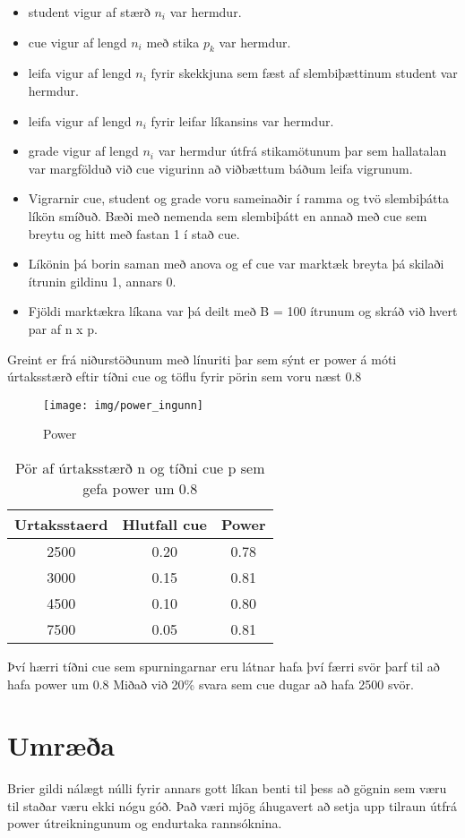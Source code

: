 \documentclass[
  10pt,
]{article}
\begin{document}
\begin{itemize}
\item
  student vigur af stærð \(n_i\) var hermdur.
\item
  cue vigur af lengd \(n_i\) með stika \(p_k\) var hermdur.
\item
  leifa vigur af lengd \(n_i\) fyrir skekkjuna sem fæst af slembiþættinum student var hermdur.
\item
  leifa vigur af lengd \(n_i\) fyrir leifar líkansins var hermdur.
\item
  grade vigur af lengd \(n_i\) var hermdur útfrá stikamötunum þar sem hallatalan var margfölduð við cue vigurinn að viðbættum báðum leifa vigrunum.
\item
  Vigrarnir cue, student og grade voru sameinaðir í ramma og tvö slembiþátta líkön smíðuð. Bæði með nemenda sem slembiþátt en annað með cue sem breytu og hitt með fastan 1 í stað cue.
\item
  Líkönin þá borin saman með anova og ef cue var marktæk breyta þá skilaði ítrunin gildinu 1, annars 0.
\item
  Fjöldi marktækra líkana var þá deilt með B = 100 ítrunum og skráð við hvert par af n x p.
\end{itemize}

Greint er frá niðurstöðunum með línuriti þar sem sýnt er power á móti úrtaksstærð eftir tíðni cue og töflu fyrir pörin sem voru næst 0.8

\begin{figure}[H]

{\centering \texttt{[image: img/power\_ingunn]} 

}

\caption{Power}\label{fig:mynd9}
\end{figure}

\begin{table}[!h]

\caption{\label{tab:unnamed-chunk-14}\label{tab:strings} Pör af úrtaksstærð n og tíðni cue p sem gefa power um 0.8}
\centering
\begin{tabular}[t]{ccc}
\toprule
\textbf{Urtaksstaerd} & \textbf{Hlutfall cue} & \textbf{Power}\\
\midrule
2500 & 0.20 & 0.78\\
3000 & 0.15 & 0.81\\
4500 & 0.10 & 0.80\\
7500 & 0.05 & 0.81\\
\bottomrule
\end{tabular}
\end{table}

Því hærri tíðni cue sem spurningarnar eru látnar hafa því færri svör þarf til að hafa power um 0.8 Miðað við 20\% svara sem cue dugar að hafa 2500 svör.

\hypertarget{umruxe6uxf0a}{%
\section{Umræða}\label{umruxe6uxf0a}}

Brier gildi nálægt núlli fyrir annars gott líkan benti til þess að gögnin sem væru til staðar væru ekki nógu góð. Það væri mjög áhugavert að setja upp tilraun útfrá power útreikningunum og endurtaka rannsóknina.
\end{document}
